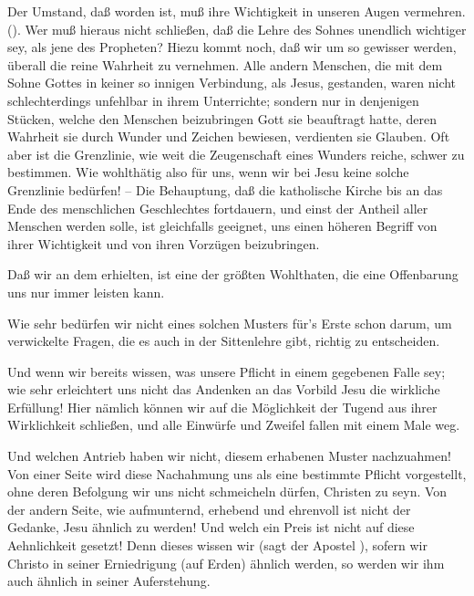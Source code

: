 \begin{aufza}
\item Der Umstand, daß  worden ist, muß ihre Wichtigkeit in unseren Augen vermehren.  (). Wer muß hieraus nicht schließen, daß die Lehre des Sohnes unendlich wichtiger sey, als jene des Propheten? Hiezu kommt noch, daß wir um so gewisser werden, überall die reine Wahrheit zu vernehmen. Alle andern Menschen, die mit dem Sohne Gottes in keiner so innigen Verbindung, als Jesus, gestanden, waren nicht schlechterdings unfehlbar in ihrem Unterrichte; sondern nur in denjenigen Stücken, welche den Menschen beizubringen Gott sie beauftragt hatte, deren Wahrheit sie durch Wunder und Zeichen bewiesen, verdienten sie Glauben. Oft aber ist die Grenzlinie, wie weit die Zeugenschaft eines Wunders reiche, schwer zu bestimmen. Wie wohlthätig also für uns, wenn wir bei Jesu keine solche Grenzlinie bedürfen! -- Die Behauptung, daß die katholische Kirche bis an das Ende des menschlichen Geschlechtes fortdauern, und einst der Antheil aller Menschen werden solle, ist gleichfalls geeignet, uns einen höheren Begriff von ihrer Wichtigkeit und von ihren Vorzügen beizubringen.
\item Daß wir an dem  erhielten, ist eine der größten Wohlthaten, die eine Offenbarung uns nur immer leisten kann.~
\begin{aufzb}
\item Wie sehr bedürfen wir nicht eines solchen Musters für's Erste schon darum, um verwickelte Fragen, die es auch in der Sittenlehre gibt, richtig zu entscheiden.
\item Und wenn wir bereits wissen, was unsere Pflicht in einem gegebenen Falle sey; wie sehr erleichtert uns nicht das Andenken an das Vorbild Jesu die wirkliche Erfüllung! Hier nämlich können wir auf die Möglichkeit der Tugend aus ihrer Wirklichkeit schließen, und alle Einwürfe und Zweifel fallen mit einem Male weg.
\item Und welchen Antrieb haben wir nicht, diesem erhabenen Muster nachzuahmen! Von einer Seite wird diese Nachahmung uns als eine bestimmte Pflicht vorgestellt, ohne deren Befolgung wir uns nicht schmeicheln dürfen, Christen zu seyn. Von der andern Seite, wie aufmunternd, erhebend und ehrenvoll ist nicht der Gedanke, Jesu ähnlich zu werden! Und welch ein Preis ist nicht auf diese Aehnlichkeit gesetzt! Denn dieses wissen wir (sagt der Apostel ), sofern wir Christo in seiner Erniedrigung (auf Erden) ähnlich werden, so werden wir ihm auch ähnlich in seiner Auferstehung.

\end{aufzb}
\end{aufza}

